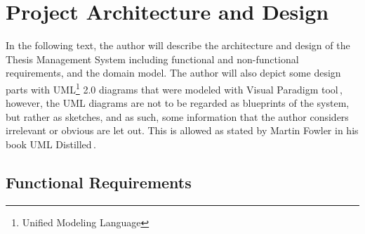 \chapter{Project Architecture and Design}

In the following text, the author will describe the architecture and design of the Thesis Management System including functional and non-functional requirements, and the domain model. The author will also depict some design parts with UML\footnote{Unified Modeling Language} 2.0 diagrams that were modeled with Visual Paradigm tool\,\cite{visual-paradigm-homepage}, however, the UML diagrams are not to be regarded as blueprints of the system, but rather as sketches, and as such, some information that the author considers irrelevant or obvious are let out. This is allowed as stated by Martin Fowler in his book UML Distilled\,\cite{fowler-uml}.

\section{Functional Requirements}


